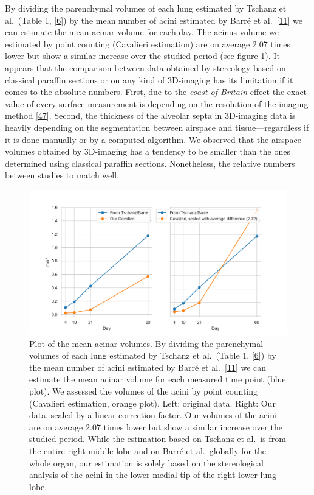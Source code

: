 \documentclass[
  american,
]{article}
\begin{document}
By dividing the parenchymal volumes of each lung estimated by Tschanz et al.~(Table 1, {[}\protect\hyperlink{ref-wnl86DEM}{6}{]}) by the mean number of acini estimated by Barré et al.~{[}\protect\hyperlink{ref-uFNlWogb}{11}{]} we can estimate the mean acinar volume for each day.
The acinus volume we estimated by point counting (Cavalieri estimation) are on average 2.07 times lower but show a similar increase over the studied period (see figure \ref{fig:06}).
It appears that the comparison between data obtained by stereology based on classical paraffin sections or on any kind of 3D-imaging has its limitation if it comes to the absolute numbers.
First, due to the \emph{coast of Britain}-effect the exact value of every surface measurement is depending on the resolution of the imaging method {[}\protect\hyperlink{ref-AdXhaEV4}{47}{]}.
Second, the thickness of the alveolar septa in 3D-imaging data is heavily depending on the segmentation between airspace and tissue---regardless if it is done manually or by a computed algorithm.
We observed that the airspace volumes obtained by 3D-imaging has a tendency to be smaller than the ones determined using classical paraffin sections.
Nonetheless, the relative numbers between studies to match well.

\begin{figure}
\hypertarget{fig:06}{%
\centering
\includegraphics{images/fig06.png}
\caption{Plot of the mean acinar volumes.
By dividing the parenchymal volumes of each lung estimated by Tschanz et al.~(Table 1, {[}\protect\hyperlink{ref-wnl86DEM}{6}{]}) by the mean number of acini estimated by Barré et al.~{[}\protect\hyperlink{ref-uFNlWogb}{11}{]} we can estimate the mean acinar volume for each measured time point (blue plot).
We assessed the volumes of the acini by point counting (Cavalieri estimation, orange plot).
Left: original data.
Right: Our data, scaled by a linear correction factor.
Our volumes of the acini are on average 2.07 times lower but show a similar increase over the studied period.
While the estimation based on Tschanz et al.~is from the entire right middle lobe and on Barré et al.~globally for the whole organ, our estimation is solely based on the stereological analysis of the acini in the lower medial tip of the right lower lung lobe.}\label{fig:06}
}
\end{figure}
\end{document}
